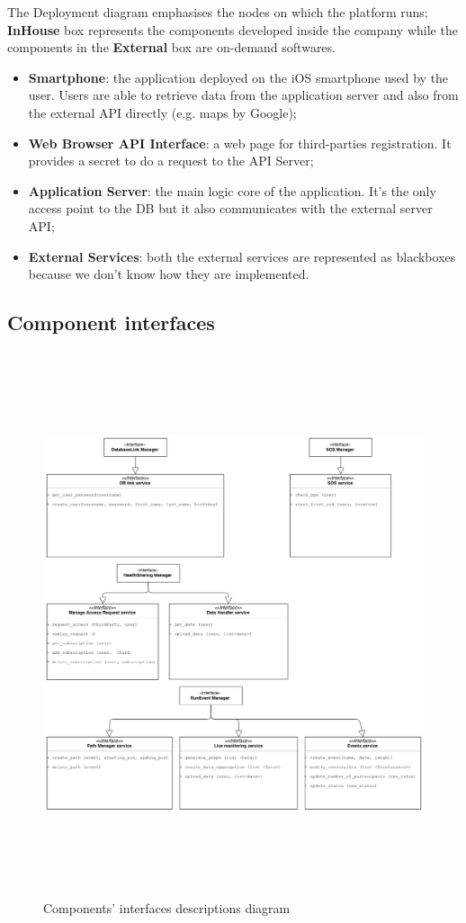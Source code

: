 \documentclass[DD.tex]{subfiles}
\begin{document}
The Deployment diagram emphasises the nodes on which the platform runs;\\
\textbf{InHouse} box represents the components developed inside the company while 
the components in the \textbf{External} box are on-demand softwares.\\
\begin{itemize}
\item	\textbf{Smartphone}: the application deployed on the iOS smartphone used by the user. Users are able to retrieve data from the application server and also from the external API directly (e.g. maps by Google);
\item \textbf{Web Browser API Interface}: a web page for third-parties registration. It provides a secret to do a request to the API Server;
\item \textbf{Application Server}: the  main logic core of the application. It’s the only access point to the DB but it also communicates with the external server API;
\item  \textbf{External Services}: both the external services are represented as  blackboxes because we don't know how they are implemented.
\end{itemize}
\newpage

	
	
\newpage
\subsection{Component interfaces}
\begin{figure}[h!]
	\centering
	\includegraphics[height=16.00cm,keepaspectratio]{Figures/Interfaces}
	\caption{Components' interfaces descriptions diagram}
\end{figure}
\end{document}
